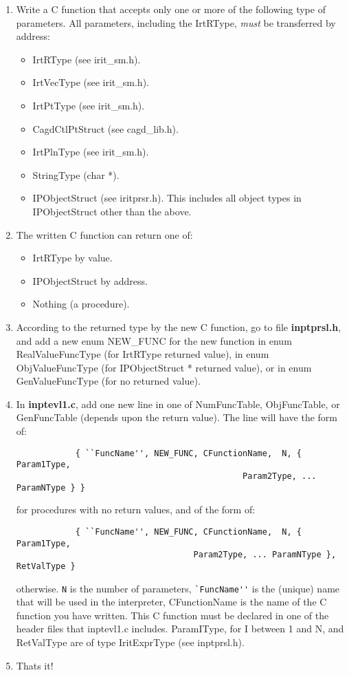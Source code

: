 \begin{enumerate}
\item Write a C function that accepts only one or more of the following
     type of parameters.  All parameters, including the IrtRType, {\em must}
     be transferred by address:
    \begin{itemize}
	\item IrtRType         (see irit\_sm.h).
	\item IrtVecType       (see irit\_sm.h).
	\item IrtPtType        (see irit\_sm.h).
	\item CagdCtlPtStruct  (see cagd\_lib.h).
	\item IrtPlnType       (see irit\_sm.h).
	\item StringType       (char *).
	\item IPObjectStruct   (see iritprsr.h).  This includes all object
		types in IPObjectStruct other than the above.
    \end{itemize}
\item The written C function can return one of:
    \begin{itemize}
	\item IrtRType by value.
	\item IPObjectStruct by address.
	\item Nothing (a procedure).
    \end{itemize}
\item According to the returned type by the new C function, go to file
	{\bf inptprsl.h}, and add a new enum NEW\_FUNC for the new function in
	enum RealValueFuncType (for IrtRType returned value), in
	enum ObjValueFuncType (for IPObjectStruct * returned value), or in
	enum GenValueFuncType (for no returned value).
\item In {\bf inptevl1.c}, add one new line in one of NumFuncTable,
	ObjFuncTable, or GenFuncTable (depends upon the return value).
	The line will have the form of:
	\begin{verbatim}
            { ``FuncName'', NEW_FUNC, CFunctionName,  N, { Param1Type,
                                              Param2Type, ... ParamNType } }
	\end{verbatim}
	for procedures with no return values, and of the form of:
	\begin{verbatim}
            { ``FuncName'', NEW_FUNC, CFunctionName,  N, { Param1Type,
                                    Param2Type, ... ParamNType }, RetValType }
	\end{verbatim}
	otherwise. \verb-N- is the number of parameters,
	\verb-`FuncName''- is the (unique) name that will be used in
	the interpreter, CFunctionName is the name of the C function you
	have written. This C function must be declared in one of the header
	files that inptevl1.c includes. ParamIType, for I between 1 and N,
	and RetValType are of type IritExprType (see inptprsl.h).
\item Thats it!
\end{enumerate}

